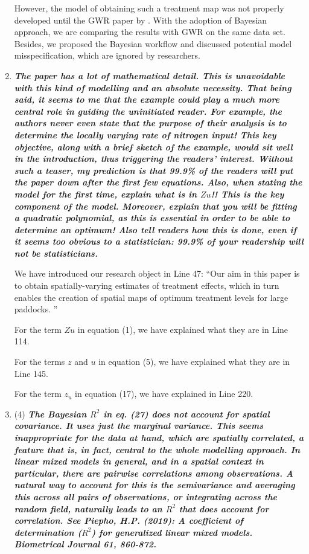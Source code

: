\documentclass[a4paper]{article}   	%
\newcommand{\qtitle}[1]{\textit{\textbf{#1}}}
\begin{document}
\begin{enumerate}
	However, the model of obtaining such a treatment map was not properly developed until the GWR paper by \textcite{Rakshit2020Novel}. With the adoption of Bayesian approach, we are comparing the results with GWR on the same data set. Besides, we proposed the Bayesian workflow and discussed potential model misspecification, which are ignored by researchers. 

    \item \qtitle{The paper has a lot of mathematical detail. This is unavoidable with this kind of modelling and an absolute necessity. That being said, it seems to me that the example could play a much more central role in guiding the uninitiated reader. For example, the authors never even state that the purpose of their analysis is to determine the locally varying rate of nitrogen input! This key objective, along with a brief sketch of the example, would sit well in the introduction, thus triggering the readers' interest. Without such a teaser, my prediction is that 99.9\% of the readers will put the paper down after the first few equations. Also, when stating the model for the first time, explain what is in $Zu$!! This is the key component of the model. Moreover, explain that you will be fitting a quadratic polynomial, as this is essential in order to be able to determine an optimum! Also tell readers how this is done, even if it seems too obvious to a statistician: 99.9\% of your readership will not be statisticians.}

    We have introduced our research object in Line 47: ``Our  aim  in  this  paper  is to  obtain  spatially-varying  estimates  of  treatment  effects,  which  in  turn  enables  the creation of spatial maps of optimum treatment levels for large paddocks. ''
    
    For the term $Zu$ in equation (1), we have explained what they are in Line 114. 
    
    For the terms $z$ and $u$ in equation (5), we have explained what they are in Line 145. 
    
    For the term $z_u$ in equation (17), we have explained in Line 220. 
    
    \item (4) \qtitle{The Bayesian $R^2$ in eq. (27) does not account for spatial covariance. It uses just the marginal variance. This seems inappropriate for the data at hand, which are spatially correlated, a feature that is, in fact, central to the whole modelling approach. In linear mixed models in general, and in a spatial context in particular, there are pairwise correlations among observations. A natural way to account for this is the semivariance and averaging this across all pairs of observations, or integrating across the random field, naturally leads to an $R^2$ that does account for correlation. See Piepho, H.P. (2019): A coefficient of determination ($R^2$) for generalized linear mixed models. Biometrical Journal 61, 860-872.}
        

\end{enumerate}
\end{document}
